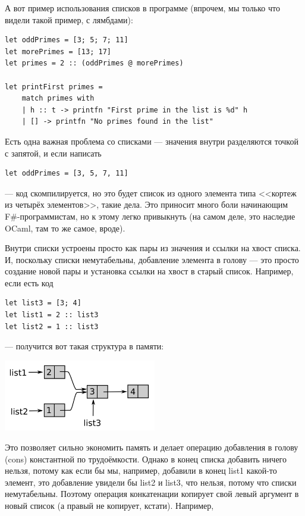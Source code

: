 \documentclass[a5paper]{article}
\begin{document}
А вот пример использования списков в программе (впрочем, мы только что видели такой пример, с лямбдами):

\begin{verbatim}
let oddPrimes = [3; 5; 7; 11]
let morePrimes = [13; 17]
let primes = 2 :: (oddPrimes @ morePrimes)

let printFirst primes =
    match primes with
    | h :: t -> printfn "First prime in the list is %d" h
    | [] -> printfn "No primes found in the list"
\end{verbatim}

Есть одна важная проблема со списками --- значения внутри разделяются точкой с запятой, и если написать

\begin{verbatim}
let oddPrimes = [3, 5, 7, 11]
\end{verbatim}

--- код скомпилируется, но это будет список из одного элемента типа <<кортеж из четырёх элементов>>, такие дела. Это приносит много боли начинающим F\#-программистам, но к этому легко привыкнуть (на самом деле, это наследие OCaml, там то же самое, вроде).

Внутри списки устроены просто как пары из значения и ссылки на хвост списка. И, поскольку списки немутабельны, добавление элемента в голову --- это просто создание новой пары и установка ссылки на хвост в старый список. Например, если есть код

\begin{verbatim}
let list3 = [3; 4]
let list1 = 2 :: list3
let list2 = 1 :: list3
\end{verbatim}

--- получится вот такая структура в памяти:

\begin{center}
    \includegraphics[width=0.5\textwidth]{lists.png}
\end{center}

Это позволяет сильно экономить память и делает операцию добавления в голову (cons) константной по трудоёмкости. Однако в конец списка добавить ничего нельзя, потому как если бы мы, например, добавили в конец list1 какой-то элемент, это добавление увидели бы list2 и list3, что нельзя, потому что списки немутабельны. Поэтому операция конкатенации копирует свой левый аргумент в новый список (а правый не копирует, кстати). Например, 
\end{document}
